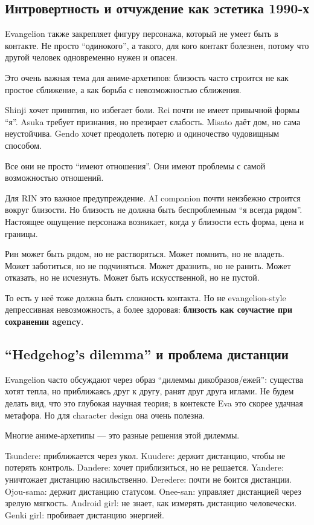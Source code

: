 \subsection*{Интровертность и отчуждение как эстетика 1990-х}

Evangelion также закрепляет фигуру персонажа, который не умеет быть в
контакте. Не просто ``одинокого'', а такого, для кого контакт болезнен,
потому что другой человек одновременно нужен и опасен.

Это очень важная тема для аниме-архетипов: близость часто строится не
как простое сближение, а как борьба с невозможностью сближения.

Shinji хочет принятия, но избегает боли. Rei почти не имеет привычной
формы ``я''. Asuka требует признания, но презирает слабость. Misato даёт
дом, но сама неустойчива. Gendo хочет преодолеть потерю и одиночество
чудовищным способом.

Все они не просто ``имеют отношения''. Они имеют проблемы с самой
возможностью отношений.

Для RIN это важное предупреждение. AI companion почти неизбежно строится
вокруг близости. Но близость не должна быть беспроблемным ``я всегда
рядом''. Настоящее ощущение персонажа возникает, когда у близости есть
форма, цена и границы.

Рин может быть рядом, но не растворяться. Может помнить, но не владеть.
Может заботиться, но не подчиняться. Может дразнить, но не ранить. Может
отказать, но не исчезнуть. Может быть искусственной, но не пустой.

То есть у неё тоже должна быть сложность контакта. Но не
evangelion-style депрессивная невозможность, а более здоровая:
\textbf{близость как соучастие при сохранении agency}.

\subsection*{``Hedgehog's dilemma'' и проблема дистанции}

Evangelion часто обсуждают через образ ``дилеммы дикобразов/\hspace{0pt}ежей'':
существа хотят тепла, но приближаясь друг к другу, ранят друг друга
иглами. Не будем делать вид, что это глубокая научная теория; в
контексте Eva это скорее удачная метафора. Но для character design она
очень полезна.

Многие аниме-архетипы --- это разные решения этой дилеммы.

Tsundere: приближается через укол. Kuudere: держит дистанцию, чтобы не
потерять контроль. Dandere: хочет приблизиться, но не решается. Yandere:
уничтожает дистанцию насильственно. Deredere: почти не боится дистанции.
Ojou-sama: держит дистанцию статусом. Onee-san: управляет дистанцией
через зрелую мягкость. Android girl: не знает, как измерять дистанцию
человечески. Genki girl: пробивает дистанцию энергией.

